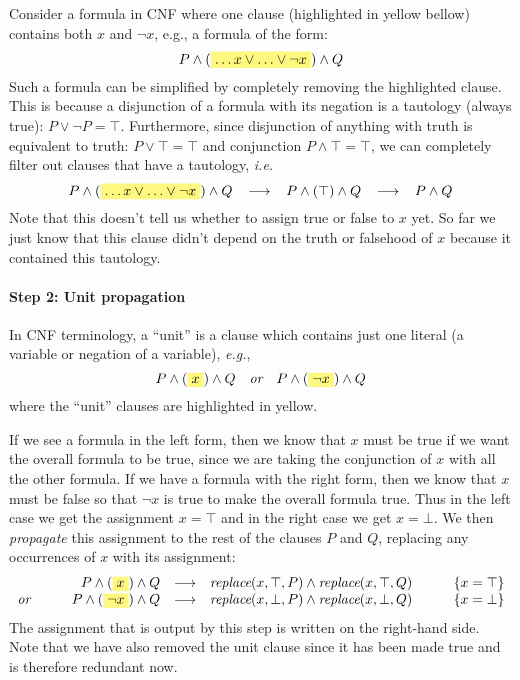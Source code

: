 \documentclass{article}
\theoremstyle{definition}
\newcommand{\ie}{\emph{i.e.}}
\newcommand{\eg}{\emph{e.g.}}
\newcommand{\subst}[3]{\textit{replace}(#2, #1, #3)}
\newcommand{\highlight}[1]{%
  \colorbox{yellow!50}{$\displaystyle#1$}}
\begin{document}
Consider a formula in CNF where one clause (highlighted in yellow
bellow) contains both $x$ and $\neg x$, e.g., a formula of
the form:
%
\begin{equation*}
P \wedge (\highlight{\ldots x \vee \ldots \vee \neg x}) \wedge Q
\end{equation*}
%
Such a formula can be simplified by completely removing the
highlighted clause. This is because a disjunction of a formula with
its negation is a tautology (always true): $P \vee \neg P = \top$.
Furthermore, since disjunction of anything with truth is equivalent to truth:
$P \vee \top = \top$ and conjunction $P \wedge \top = \top$, we can 
completely filter out clauses that have a tautology, \ie{}
%
\begin{equation*}
P \wedge (\highlight{\ldots x \vee \ldots \vee \neg x}) \wedge Q
\;\;\; \longrightarrow \;\;\;
P \wedge (\top) \wedge Q
\;\;\; \longrightarrow \;\;\;
P \wedge Q
\end{equation*}
%
Note that this doesn't tell us whether to assign true or false to
$x$ yet. So far we just know that this clause didn't depend on the
truth or falsehood of $x$ because it contained this tautology.

\paragraph{Step 2: Unit propagation}

In CNF terminology, a ``unit'' is a clause which contains just one
literal (a variable or negation of a variable), \eg{},
%
\begin{equation*}
P \wedge (\highlight{x}) \wedge Q
\quad
\textit{or}
\quad
P \wedge (\highlight{\neg x}) \wedge Q
\end{equation*}
%
where the ``unit'' clauses are highlighted in yellow.

If we see a formula in the left form, then we know that $x$ must be
true if we want the overall formula to be true, since we are taking
the conjunction of $x$ with all the other formula. If we have a
formula with the right form, then we know that $x$ must be false so
that $\neg x$ is true to make the overall formula true. Thus
in the left case we get the assignment $x = \top$ and in the right
case we get $x = \bot$. We then \emph{propagate} this assignment to
the rest of the clauses $P$ and $Q$, replacing any occurrences of $x$
with its assignment:
%
\begin{align*}
  \begin{array}{lrcll}
& P \wedge (\highlight{x}) \wedge Q
& \longrightarrow &
\subst{\top}{x}{P} \wedge \subst{\top}{x}{Q} & \qquad
\{x = \top\} \\
\textit{or} \qquad & P \wedge
(\highlight{\neg x}) \wedge Q
& \longrightarrow &
\subst{\bot}{x}{P} \wedge \subst{\bot}{x}{Q} & \qquad
\{x = \bot\}
\end{array}
\end{align*}
%
The assignment that is output by this step
is written on the right-hand side. Note that we have also removed
the unit clause since it has been made true and is therefore
redundant now.
\end{document}

